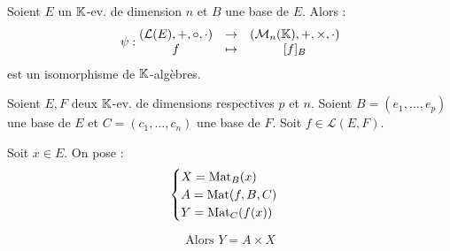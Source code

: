 \documentclass[12pt,a4paper]{report}
\begin{document}
\begin{property}
    Soient $E$ un $\mathbb{K}$-ev. de dimension $n$ et $B$ une base de $E$. Alors :
    $$\psi : \begin{matrix} (\mathcal L(E),+,\circ,\cdot) &\to &(\mathcal M_n(\mathbb{K}),+, \times, \cdot) \\ f &\mapsto &[f]_B \end{matrix}$$
    est un isomorphisme de $\mathbb{K}$-algèbres.
\end{property}

\begin{property}
    Soient $E,F$ deux $\mathbb{K}$-ev. de dimensions respectives $p$ et $n$. Soient $B=(e_1,\ldots,e_p)$ une base de $E$ et $C=(c_1,\ldots,c_n)$ une base de $F$. Soit $f \in \mathcal L(E,F)$.

    Soit $x \in E$. On pose :
    $$\begin{cases}
    X = \mathrm{Mat}_B(x)\\
    A = \mathrm{Mat}(f,B,C)\\
    Y = \mathrm{Mat}_C(f(x))
    \end{cases}$$

    $$\text{Alors } Y = A \times X$$
\end{property}
\end{document}
